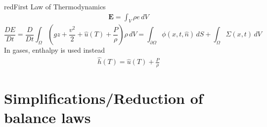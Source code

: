 \documentclass[a4paper, 11pt,article,oneside]{memoir}%
\begin{document}
\begin{eqbox2}{red}{First Law of Thermodynamics}
\begin{align*}
\boldsymbol{E}=\int_V \rho e \,dV
\end{align*}
\begin{equation*}
\frac{DE}{Dt}=\frac{D}{Dt}\int_\Omega \left(gz+\frac{v^2}{2}+\hat{u}(T)+\frac{P}{\rho}\right)\rho\, dV=\int_{\partial \Omega}\phi(x,t,\hat{n})\,dS +\int_\Omega \Sigma(x,t) \,dV
\end{equation*}
\vspace{0.2cm}
In gases, enthalpy is used instead 
\begin{align*}
\hat{h}(T)=\hat{u}(T)+\frac{P}{\rho}
\end{align*}
\end{eqbox2}

\section{Simplifications/Reduction of balance laws}
\end{document}
